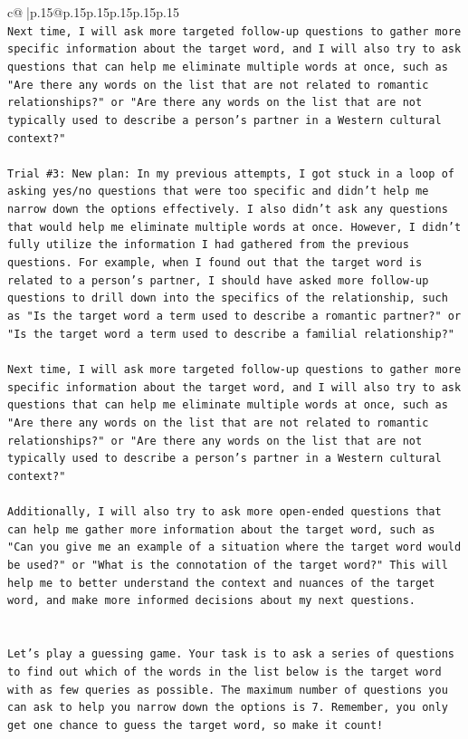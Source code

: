 \documentclass{article}
\begin{document}
{\begin{supertabular}{c@{$\;$}|p{.15\linewidth}@{}p{.15\linewidth}p{.15\linewidth}p{.15\linewidth}p{.15\linewidth}p{.15\linewidth}}
{{{\\ 
\texttt{Next time, I will ask more targeted follow{-}up questions to gather more specific information about the target word, and I will also try to ask questions that can help me eliminate multiple words at once, such as "Are there any words on the list that are not related to romantic relationships?" or "Are there any words on the list that are not typically used to describe a person's partner in a Western cultural context?"} \\
\\ 
\texttt{Trial \#3: New plan: In my previous attempts, I got stuck in a loop of asking yes/no questions that were too specific and didn't help me narrow down the options effectively. I also didn't ask any questions that would help me eliminate multiple words at once. However, I didn't fully utilize the information I had gathered from the previous questions. For example, when I found out that the target word is related to a person's partner, I should have asked more follow{-}up questions to drill down into the specifics of the relationship, such as "Is the target word a term used to describe a romantic partner?" or "Is the target word a term used to describe a familial relationship?" } \\
\\ 
\texttt{Next time, I will ask more targeted follow{-}up questions to gather more specific information about the target word, and I will also try to ask questions that can help me eliminate multiple words at once, such as "Are there any words on the list that are not related to romantic relationships?" or "Are there any words on the list that are not typically used to describe a person's partner in a Western cultural context?" } \\
\\ 
\texttt{Additionally, I will also try to ask more open{-}ended questions that can help me gather more information about the target word, such as "Can you give me an example of a situation where the target word would be used?" or "What is the connotation of the target word?" This will help me to better understand the context and nuances of the target word, and make more informed decisions about my next questions.} \\
\\ 
\\ 
\texttt{Let's play a guessing game. Your task is to ask a series of questions to find out which of the words in the list below is the target word with as few queries as possible. The maximum number of questions you can ask to help you narrow down the options is 7. Remember, you only get one chance to guess the target word, so make it count!} \\
}}}
\end{supertabular}}
\end{document}
